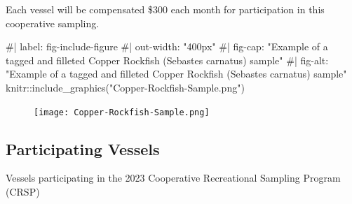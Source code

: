 \documentclass[
  letterpaper,
  DIV=11,
  numbers=noendperiod]{scrartcl}
\newenvironment{Shaded}{\begin{snugshade}}{\end{snugshade}}
\newcommand{\CommentTok}[1]{\textcolor[rgb]{0.37,0.37,0.37}{#1}}
\newcommand{\FunctionTok}[1]{\textcolor[rgb]{0.28,0.35,0.67}{#1}}
\newcommand{\NormalTok}[1]{\textcolor[rgb]{0.00,0.23,0.31}{#1}}
\newcommand{\SpecialCharTok}[1]{\textcolor[rgb]{0.37,0.37,0.37}{#1}}
\newcommand{\StringTok}[1]{\textcolor[rgb]{0.13,0.47,0.30}{#1}}
\begin{document}
Each vessel will be compensated \$300 each month for participation in
this cooperative sampling.

\begin{Shaded}
\begin{Highlighting}[]
\CommentTok{\#| label: fig{-}include{-}figure}
\CommentTok{\#| out{-}width: "400px"}
\CommentTok{\#| fig{-}cap: "Example of a tagged and filleted Copper Rockfish (Sebastes carnatus) sample"}
\CommentTok{\#| fig{-}alt: "Example of a tagged and filleted Copper Rockfish (Sebastes carnatus) sample"}
\NormalTok{knitr}\SpecialCharTok{::}\FunctionTok{include\_graphics}\NormalTok{(}\StringTok{"Copper{-}Rockfish{-}Sample.png"}\NormalTok{)}
\end{Highlighting}
\end{Shaded}

\begin{figure}[H]

{\centering \texttt{[image: Copper-Rockfish-Sample.png]}

}

\end{figure}

\hypertarget{participating-vessels}{%
\subsection{Participating Vessels}\label{participating-vessels}}

Vessels participating in the 2023 Cooperative Recreational Sampling
Program (CRSP)
\end{document}
